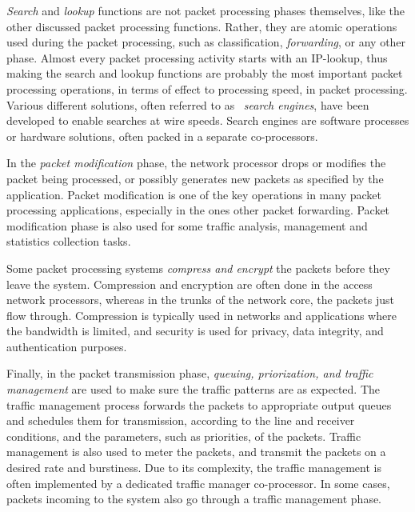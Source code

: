 \emph{Search} and \emph{lookup} functions are not packet processing phases themselves, like the other discussed packet processing functions. Rather, they are atomic operations used during the packet processing, such as classification, \emph{forwarding}, or any other phase. Almost every packet processing activity starts with an IP-lookup, thus making the search and lookup functions are probably the most important packet processing operations, in terms of effect to processing speed, in packet processing. Various different solutions, often referred to as ~\emph{search engines}, have been developed to enable searches at wire speeds. Search engines are software processes or hardware solutions, often packed in a separate co-processors.~\cite{Giladi:2008:Network}


In the \emph{packet modification} phase, the network processor drops or modifies the packet being processed, or possibly generates new packets as specified by the application. Packet modification is one of the key operations in many packet processing applications, especially in the ones other packet forwarding. Packet modification phase is also used for some traffic analysis, management and statistics collection tasks.~\cite{Giladi:2008:Network}

Some packet processing systems \emph{compress and encrypt} the packets before they leave the system. Compression and encryption are often done in the access network processors, whereas in the trunks of the network core, the packets just flow through. Compression is typically used in networks and applications where the bandwidth is limited, and security is used for privacy, data integrity, and authentication purposes.~\cite{Giladi:2008:Network}

Finally, in the packet transmission phase, \emph{queuing, priorization, and traffic management} are used to make sure the traffic patterns are as expected. The traffic management process forwards the packets to appropriate output queues and schedules them for transmission, according to the line and receiver conditions, and the parameters, such as priorities, of the packets. Traffic management is also used to meter the packets, and transmit the packets on a desired rate and burstiness. Due to its complexity, the traffic management is often implemented by a dedicated traffic manager co-processor. In some cases, packets incoming to the system also go through a traffic management phase.~\cite{Giladi:2008:Network}

